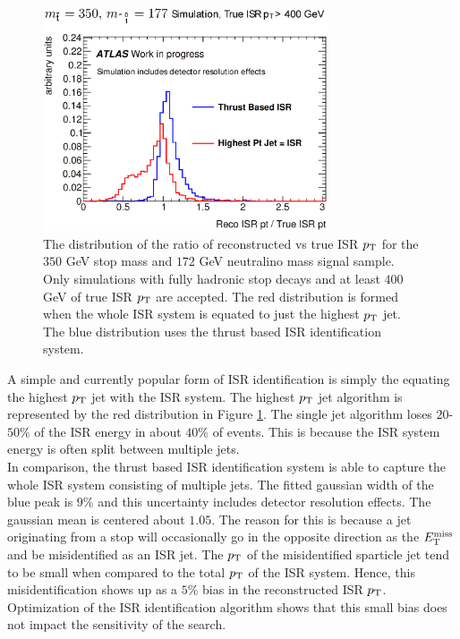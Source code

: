 \begin{figure}[h]
\centering
\includegraphics[width=0.75\textwidth]{./figures/strategy/ThrustAlgoEfficiency.eps}
\caption{The distribution of the ratio of reconstructed vs true ISR $p_{\mathrm{T}}$ for the $350$ GeV stop mass and $172$ GeV neutralino mass signal sample.  Only simulations with fully hadronic stop decays and at least $400$ GeV of true ISR $p_{\mathrm{T}}$ are accepted.  The red distribution is formed when the whole ISR system is equated to just the highest $p_{\mathrm{T}}$ jet.  The blue distribution uses the thrust based ISR identification system.  \label{fig:ISRPerformance}}
\end{figure}

\indent A simple and currently popular form of ISR identification is simply the equating the highest $p_{\mathrm{T}}$ jet with the ISR system. The highest $p_{\mathrm{T}}$ jet algorithm is represented by the red distribution in Figure \ref{fig:ISRPerformance}. The single jet algorithm loses $20$-$50$\% of the ISR energy in about $40$\% of events.  This is because the ISR system energy is often split between multiple jets. \\

\indent In comparison, the thrust based ISR identification system is able to capture the whole ISR system consisting of multiple jets.  The fitted gaussian width of the blue peak is $9$\% and this uncertainty includes detector resolution effects.  The gaussian mean is centered about $1.05$.  The reason for this is because a jet originating from a stop will occasionally go in the opposite direction as the $E_{\mathrm{T}}^{\mathrm{miss}}$ and be misidentified as an ISR jet.  The $p_{\mathrm{T}}$ of the misidentified sparticle jet tend to be small when compared to the total $p_{\mathrm{T}}$ of the ISR system.  Hence, this misidentification shows up as a $5$\% bias in the reconstructed ISR $p_{\mathrm{T}}$.  Optimization of the ISR identification algorithm shows that this small bias does not impact the sensitivity of the search.  \\

